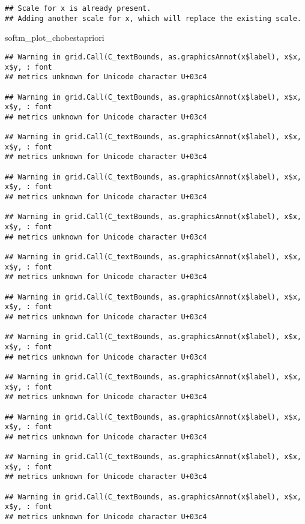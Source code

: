 \documentclass[
]{article}
\newenvironment{Shaded}{\begin{snugshade}}{\end{snugshade}}
\newcommand{\NormalTok}[1]{#1}
\begin{document}
\begin{verbatim}
## Scale for x is already present.
## Adding another scale for x, which will replace the existing scale.
\end{verbatim}

\begin{Shaded}
\begin{Highlighting}[]
\NormalTok{softm\_plot\_chobestapriori}
\end{Highlighting}
\end{Shaded}

\begin{verbatim}
## Warning in grid.Call(C_textBounds, as.graphicsAnnot(x$label), x$x, x$y, : font
## metrics unknown for Unicode character U+03c4

## Warning in grid.Call(C_textBounds, as.graphicsAnnot(x$label), x$x, x$y, : font
## metrics unknown for Unicode character U+03c4

## Warning in grid.Call(C_textBounds, as.graphicsAnnot(x$label), x$x, x$y, : font
## metrics unknown for Unicode character U+03c4

## Warning in grid.Call(C_textBounds, as.graphicsAnnot(x$label), x$x, x$y, : font
## metrics unknown for Unicode character U+03c4

## Warning in grid.Call(C_textBounds, as.graphicsAnnot(x$label), x$x, x$y, : font
## metrics unknown for Unicode character U+03c4

## Warning in grid.Call(C_textBounds, as.graphicsAnnot(x$label), x$x, x$y, : font
## metrics unknown for Unicode character U+03c4

## Warning in grid.Call(C_textBounds, as.graphicsAnnot(x$label), x$x, x$y, : font
## metrics unknown for Unicode character U+03c4

## Warning in grid.Call(C_textBounds, as.graphicsAnnot(x$label), x$x, x$y, : font
## metrics unknown for Unicode character U+03c4

## Warning in grid.Call(C_textBounds, as.graphicsAnnot(x$label), x$x, x$y, : font
## metrics unknown for Unicode character U+03c4

## Warning in grid.Call(C_textBounds, as.graphicsAnnot(x$label), x$x, x$y, : font
## metrics unknown for Unicode character U+03c4

## Warning in grid.Call(C_textBounds, as.graphicsAnnot(x$label), x$x, x$y, : font
## metrics unknown for Unicode character U+03c4

## Warning in grid.Call(C_textBounds, as.graphicsAnnot(x$label), x$x, x$y, : font
## metrics unknown for Unicode character U+03c4


\end{verbatim}
\end{document}
